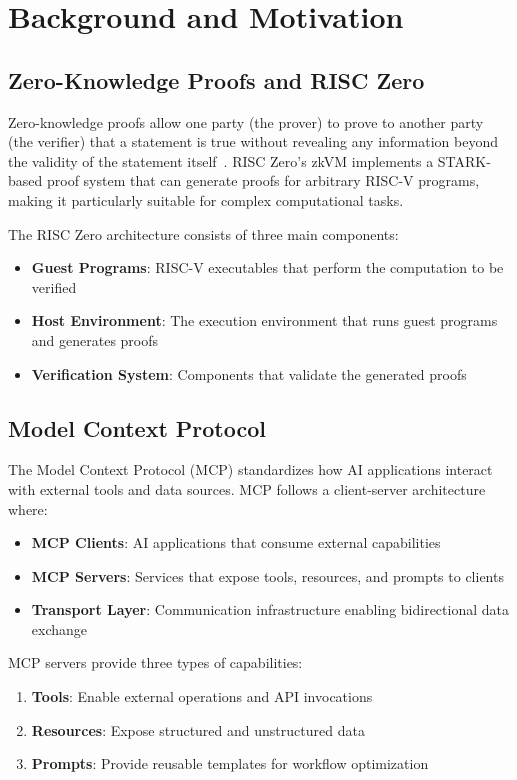 \documentclass[11pt]{article}
\begin{document}
\section{Background and Motivation}
\label{sec:background}

\subsection{Zero-Knowledge Proofs and RISC Zero}

Zero-knowledge proofs allow one party (the prover) to prove to another party (the verifier) that a statement is true without revealing any information beyond the validity of the statement itself~\cite{goldwasser1985knowledge}. RISC Zero's zkVM implements a STARK-based proof system that can generate proofs for arbitrary RISC-V programs, making it particularly suitable for complex computational tasks.

The RISC Zero architecture consists of three main components:
\begin{itemize}
\item \textbf{Guest Programs}: RISC-V executables that perform the computation to be verified
\item \textbf{Host Environment}: The execution environment that runs guest programs and generates proofs  
\item \textbf{Verification System}: Components that validate the generated proofs
\end{itemize}

\subsection{Model Context Protocol}

The Model Context Protocol (MCP) standardizes how AI applications interact with external tools and data sources. MCP follows a client-server architecture where:

\begin{itemize}
\item \textbf{MCP Clients}: AI applications that consume external capabilities
\item \textbf{MCP Servers}: Services that expose tools, resources, and prompts to clients
\item \textbf{Transport Layer}: Communication infrastructure enabling bidirectional data exchange
\end{itemize}

MCP servers provide three types of capabilities:
\begin{enumerate}
\item \textbf{Tools}: Enable external operations and API invocations
\item \textbf{Resources}: Expose structured and unstructured data
\item \textbf{Prompts}: Provide reusable templates for workflow optimization
\end{enumerate}
\end{document}
